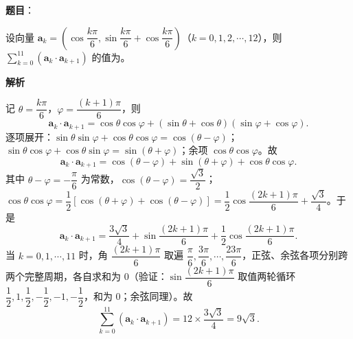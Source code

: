 \begin{answer}

\textbf{题目}：

设向量 \(\boldsymbol a_{k}=\left(\cos\dfrac{k\pi}{6},\sin\dfrac{k\pi}{6}+\cos\dfrac{k\pi}{6}\right)\)（\(k=0,1,2,\cdots,12\)），则 \(\sum\limits_{k=0}^{11}(\boldsymbol a_{k}\cdot\boldsymbol a_{k+1})\) 的值为\gkblank{}。

\textbf{解析}

记 \(\theta=\dfrac{k\pi}{6}\)，\(\varphi=\dfrac{(k+1)\pi}{6}\)，则
\nopagebreak[4]
\[
\boldsymbol a_{k}\cdot\boldsymbol a_{k+1}=\cos\theta\cos\varphi+\left(\sin\theta+\cos\theta\right)\left(\sin\varphi+\cos\varphi\right).
\]
逐项展开：\(\sin\theta\sin\varphi+\cos\theta\cos\varphi=\cos(\theta-\varphi)\)；\(\sin\theta\cos\varphi+\cos\theta\sin\varphi=\sin(\theta+\varphi)\)；余项 \(\cos\theta\cos\varphi\)。故
\nopagebreak[4]
\[
\boldsymbol a_{k}\cdot\boldsymbol a_{k+1}=\cos(\theta-\varphi)+\sin(\theta+\varphi)+\cos\theta\cos\varphi.
\]
其中 \(\theta-\varphi=-\dfrac{\pi}{6}\) 为常数，\(\cos(\theta-\varphi)=\dfrac{\sqrt{3}}{2}\)；\(\cos\theta\cos\varphi=\dfrac{1}{2}\left[\cos(\theta+\varphi)+\cos(\theta-\varphi)\right]=\dfrac{1}{2}\cos\dfrac{(2k+1)\pi}{6}+\dfrac{\sqrt{3}}{4}\)。于是
\nopagebreak[4]
\[
\boldsymbol a_{k}\cdot\boldsymbol a_{k+1}=\frac{3\sqrt{3}}{4}+\sin\frac{(2k+1)\pi}{6}+\frac{1}{2}\cos\frac{(2k+1)\pi}{6}.
\]
当 \(k=0,1,\cdots,11\) 时，角 \(\dfrac{(2k+1)\pi}{6}\) 取遍 \(\dfrac{\pi}{6},\dfrac{3\pi}{6},\cdots,\dfrac{23\pi}{6}\)，正弦、余弦各项分别跨两个完整周期，各自求和为 \(0\)（验证：\(\sin\dfrac{(2k+1)\pi}{6}\) 取值两轮循环 \(\dfrac12,1,\dfrac12,-\dfrac12,-1,-\dfrac12\)，和为 \(0\)；余弦同理）。故
\nopagebreak[4]
\[
\sum_{k=0}^{11}(\boldsymbol a_{k}\cdot\boldsymbol a_{k+1})=12\times\frac{3\sqrt{3}}{4}=9\sqrt{3}.
\]


\end{answer}
